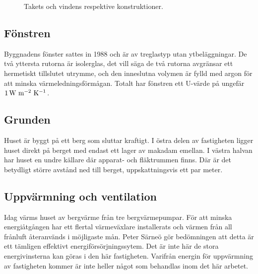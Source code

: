\begin{figure}[hpbt]
\centering
{}
\caption{\label{fig:roof_attic} Takets och vindens respektive konstruktioner.}
\end{figure}


\subsection{Fönstren}

Byggnadens fönster sattes in 1988 och är av treglastyp utan ytbeläggningar. De två yttersta rutorna är isolerglas, det vill säga de två rutorna avgränsar ett hermetiskt tillslutet utrymme, och den inneslutna volymen är fylld med argon för att minska värmeledningsförmågan. Totalt har fönstren ett U-värde på ungefär $\unit[1]{W~m^{-2}~K^{-1}}$.

\subsection{Grunden}

Huset är byggt på ett berg som sluttar kraftigt. I östra delen av fastigheten ligger huset direkt på berget med endast ett lager av makadam emellan\cite{petersarneo}. I västra halvan har huset en undre källare där apparat- och fläktrummen finns. Där är det betydligt större avstånd ned till berget, uppskattningsvis ett par meter. %

\subsection{Uppvärmning och ventilation}
Idag värms huset av bergvärme från tre bergvärmepumpar. För att minska energiåtgången har ett flertal värmeväxlare installerats och värmen från all frånluft återanvänds i möjligaste mån. Peter Särneö gör bedömningen att detta är ett tämligen effektivt energiförsörjningssytem. Det är inte här de stora energivinsterna kan göras i den här fastigheten. Varifrån energin för uppvärmning av fastigheten kommer är inte heller något som behandlas inom det här arbetet.
